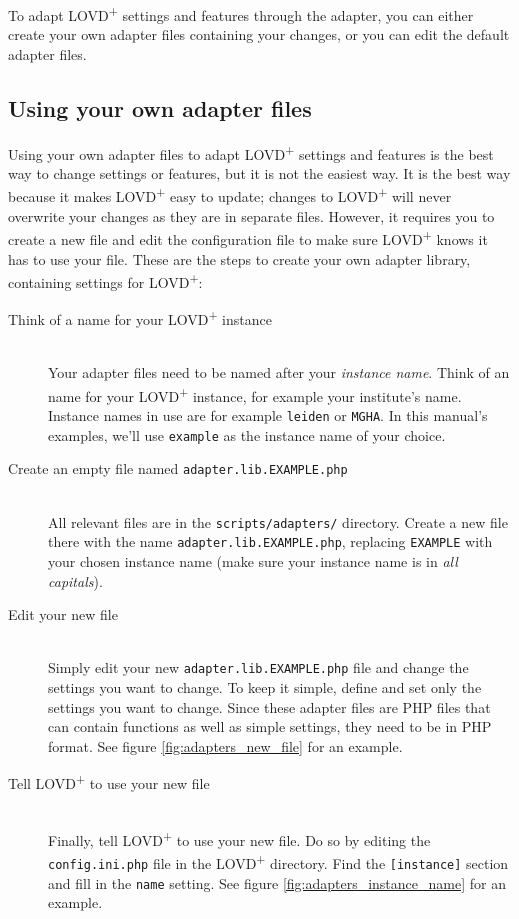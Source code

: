 To adapt LOVD\textsuperscript{+} settings and features through the adapter,
 you can either create your own adapter files containing your changes, or you can edit the default adapter files.



\subsection{Using your own adapter files}
\label{ssec:adapters_using_your_own}
Using your own adapter files to adapt LOVD\textsuperscript{+} settings and features
 is the best way to change settings or features, but it is not the easiest way.
It is the best way because it makes LOVD\textsuperscript{+} easy to update;
 changes to LOVD\textsuperscript{+} will never overwrite your changes as they are in separate files.
However, it requires you to create a new file and edit the configuration
 file to make sure LOVD\textsuperscript{+} knows it has to use your file.
These are the steps to create your own adapter library, containing settings for LOVD\textsuperscript{+}:

\begin{description}
  \item[Think of a name for your LOVD\textsuperscript{+} instance] \hfill \\
    Your adapter files need to be named after your \emph{instance name}.
    Think of an name for your LOVD\textsuperscript{+} instance, for example your institute's name.
    Instance names in use are for example \texttt{leiden} or \texttt{MGHA}.
    In this manual's examples, we'll use \texttt{example} as the instance name of your choice.
  \item[Create an empty file named \texttt{adapter.lib.EXAMPLE.php}] \hfill \\
    All relevant files are in the \texttt{scripts/adapters/} directory.
    Create a new file there with the name \texttt{adapter.lib.EXAMPLE.php},
     replacing \texttt{EXAMPLE} with your chosen instance name (make sure your instance name is in \emph{all capitals}).
  \item[Edit your new file] \hfill \\
    Simply edit your new \texttt{adapter.lib.EXAMPLE.php} file and change the settings you want to change.
    To keep it simple, define and set only the settings you want to change.
    Since these adapter files are PHP files that can contain functions as well as simple settings,
     they need to be in PHP format.
    See figure \ref{fig:adapters_new_file} for an example.
  \item[Tell LOVD\textsuperscript{+} to use your new file] \hfill \\
    Finally, tell LOVD\textsuperscript{+} to use your new file.
    Do so by editing the \texttt{config.ini.php} file in the LOVD\textsuperscript{+} directory.
    Find the \texttt{[instance]} section and fill in the \texttt{name} setting.
    See figure \ref{fig:adapters_instance_name} for an example.
\end{description}

